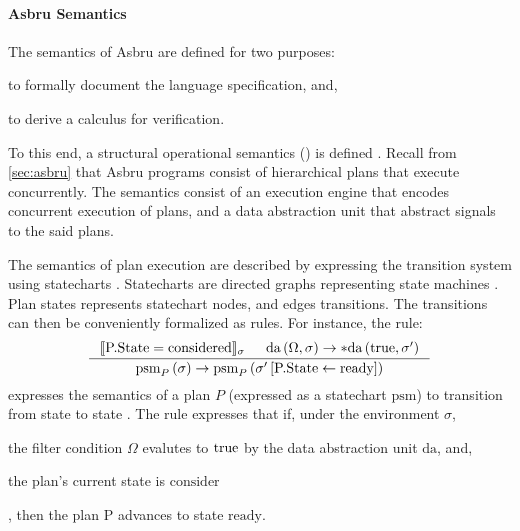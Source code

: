 \paragraph{Asbru Semantics}

The semantics of Asbru are defined for two purposes:
\begin{enumerate*}[label=(\alph*)]
  \item to formally document the language specification, and,
  \item to derive a calculus for verification.
\end{enumerate*}
To this end, a structural operational semantics (\SOS{})
is defined \cite{TuriLICS97}.
Recall from \autoref{sec:asbru} that Asbru programs
consist of hierarchical plans that execute concurrently.
The semantics consist of an execution engine that encodes
concurrent execution of plans, and a data abstraction
unit that abstract signals to the said plans.

The semantics of plan execution are described by
expressing the transition system using statecharts \cite{DammCOMPOS97}.
Statecharts are directed graphs representing state machines \cite{BalserICIDP02}.
Plan states represents statechart nodes, and edges transitions. The transitions
can then be conveniently formalized as \SOS{} rules. For instance, the rule:
$$
\inference{\llbracket \text{P.State}=\text{considered}\rrbracket_{\sigma} &
\text{da}\left(\Omega, \sigma \right) \rightarrow \ast\text{da}\left(\true{},
\sigma^{\prime}\right)}
{\text{psm}_P\left(\sigma\right) \rightarrow
\text{psm}_P\left(\sigma^{\prime}\left[\text{P.State} \leftarrow
\text{ready}\right]\right)}
$$
expresses the semantics of a plan $P$ (expressed as a statechart $\text{psm}$)
to transition from state 
to state . The \SOS{} rule expresses that
if, under the environment $\sigma$,
\begin{enumerate*}[label=(\roman*)]
  \item the filter condition $\Omega$ evalutes to $\text{true}$ by the data
    abstraction unit $\text{da}$, and,
  \item the plan's current state is $\text{consider}$
\end{enumerate*},
then the plan $\text{P}$ advances to state $\text{ready}$.


